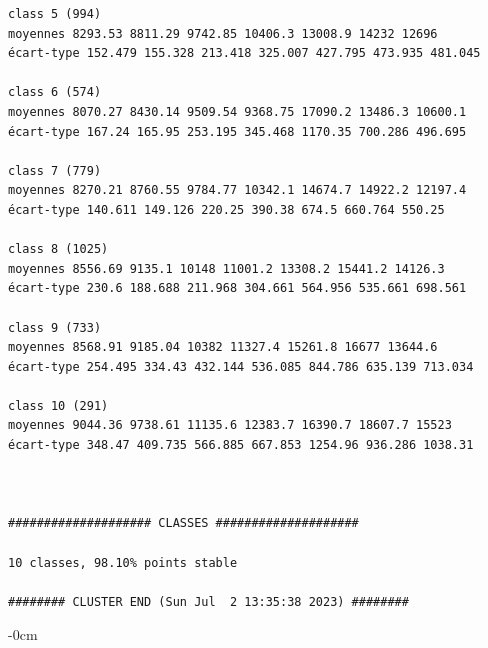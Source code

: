 \documentclass[analytics,article,submit,pdftex,moreauthors]{Definitions/mdpi}
\begin{document}
\begin{footnotesize}
\begin{verbatim}
class 5 (994)
moyennes 8293.53 8811.29 9742.85 10406.3 13008.9 14232 12696
écart-type 152.479 155.328 213.418 325.007 427.795 473.935 481.045

class 6 (574)
moyennes 8070.27 8430.14 9509.54 9368.75 17090.2 13486.3 10600.1
écart-type 167.24 165.95 253.195 345.468 1170.35 700.286 496.695

class 7 (779)
moyennes 8270.21 8760.55 9784.77 10342.1 14674.7 14922.2 12197.4
écart-type 140.611 149.126 220.25 390.38 674.5 660.764 550.25

class 8 (1025)
moyennes 8556.69 9135.1 10148 11001.2 13308.2 15441.2 14126.3
écart-type 230.6 188.688 211.968 304.661 564.956 535.661 698.561

class 9 (733)
moyennes 8568.91 9185.04 10382 11327.4 15261.8 16677 13644.6
écart-type 254.495 334.43 432.144 536.085 844.786 635.139 713.034

class 10 (291)
moyennes 9044.36 9738.61 11135.6 12383.7 16390.7 18607.7 15523
écart-type 348.47 409.735 566.885 667.853 1254.96 936.286 1038.31



#################### CLASSES ####################

10 classes, 98.10% points stable

######## CLUSTER END (Sun Jul  2 13:35:38 2023) ########

\end{verbatim}
\end{footnotesize}

\begin{adjustwidth}{-\extralength}{0cm}




\end{adjustwidth}
\end{document}
